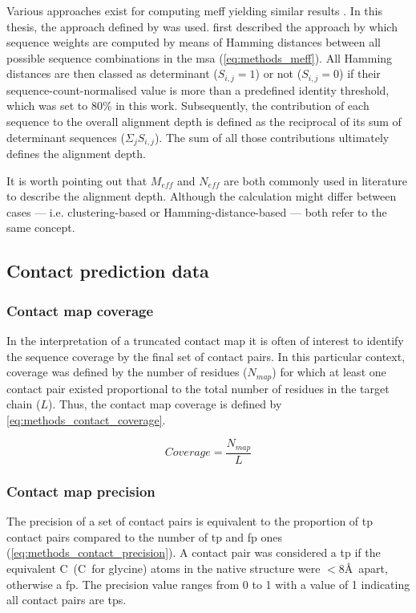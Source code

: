 Various approaches exist for computing \gls{meff} \cite{Morcos2011-lk,Jones2012-ks,Jones2015-vq} yielding similar results \cite{Skwark2014-qp}. In this thesis, the approach defined by \textcite{Morcos2011-lk} was used. \textcite{Morcos2011-lk} first described the approach by which sequence weights are computed by means of Hamming distances between all possible sequence combinations in the \gls{msa} (\cref{eq:methods_meff}). All Hamming distances are then classed as determinant ($S_{i,j}=1$) or not ($S_{i,j}=0$) if their sequence-count-normalised value is more than a predefined identity threshold, which was set to 80\% in this work. Subsequently, the contribution of each sequence to the overall alignment depth is defined as the reciprocal of its sum of determinant sequences ($\Sigma_{j} S_{i,j}$). The sum of all those contributions ultimately defines the alignment depth.

It is worth pointing out that $M_{eff}$ and $N_{eff}$ are both commonly used in literature to describe the alignment depth. Although the calculation might differ between cases --- i.e. clustering-based or Hamming-distance-based --- both refer to the same concept.

\subsection{Contact prediction data}
\subsubsection{Contact map coverage}
In the interpretation of a truncated contact map it is often of interest to identify the sequence coverage by the final set of contact pairs. In this particular context, coverage was defined by the number of residues ($N_{map}$) for which at least one contact pair existed proportional to the total number of residues in the target chain ($L$). Thus, the contact map coverage is defined by \cref{eq:methods_contact_coverage}.

\begin{equation}
    Coverage=\frac{N_{map}}{L}
    \label{eq:methods_contact_coverage}
\end{equation}

\subsubsection{Contact map precision} \label{sec:methods_contact_map_prec} 
The precision of a set of contact pairs is equivalent to the proportion of \gls{tp} contact pairs compared to the number of \gls{tp} and \gls{fp} ones (\cref{eq:methods_contact_precision}). A contact pair was considered a \gls{tp} if the equivalent C\textbeta\ (C\textalpha\ for glycine) atoms in the native structure were $<8$\AA\ apart, otherwise a \gls{fp}. The precision value ranges from 0 to 1 with a value of 1 indicating all contact pairs are \gls{tp}s. 

